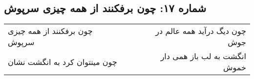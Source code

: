 \begin{center}
\section*{شماره ۱۷: چون برفکنند از همه چیزی سرپوش}
\label{sec:017}
\begin{longtable}{l p{0.5cm} r}
چون برفکنند از همه چیزی سرپوش
&&
چون دیگ درآید همه عالم در جوش
\\
چون مینتوان کرد به انگشت نشان
&&
انگشت به لب باز همی دار خموش
\\
\end{longtable}
\end{center}
